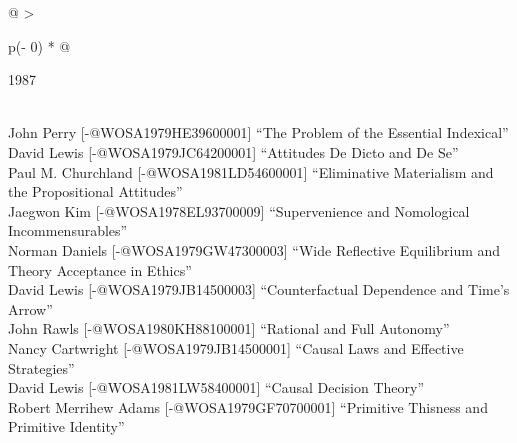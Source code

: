 \documentclass[
  10pt,
  letterpaper,
  DIV=11,
  numbers=noendperiod,
  twoside]{scrartcl}
\begin{document}
\begin{longtable}[]{@{}
  >{\raggedright\arraybackslash}p{(\columnwidth - 0\tabcolsep) * }@{}}

\caption{\label{tbl-top-ten-1978}Most cited articles published less than
ten years ago as of 1987.}

\tabularnewline

\toprule\noalign{}
\begin{minipage}[b]{\linewidth}\raggedright
1987
\end{minipage} \\
\midrule\noalign{}
\endhead
\bottomrule\noalign{}
\endlastfoot
John Perry {[}-@WOSA1979HE39600001{]} ``The Problem of the Essential
Indexical'' \\
David Lewis {[}-@WOSA1979JC64200001{]} ``Attitudes De Dicto and De
Se'' \\
Paul M. Churchland {[}-@WOSA1981LD54600001{]} ``Eliminative Materialism
and the Propositional Attitudes'' \\
Jaegwon Kim {[}-@WOSA1978EL93700009{]} ``Supervenience and Nomological
Incommensurables'' \\
Norman Daniels {[}-@WOSA1979GW47300003{]} ``Wide Reflective Equilibrium
and Theory Acceptance in Ethics'' \\
David Lewis {[}-@WOSA1979JB14500003{]} ``Counterfactual Dependence and
Time's Arrow'' \\
John Rawls {[}-@WOSA1980KH88100001{]} ``Rational and Full Autonomy'' \\
Nancy Cartwright {[}-@WOSA1979JB14500001{]} ``Causal Laws and Effective
Strategies'' \\
David Lewis {[}-@WOSA1981LW58400001{]} ``Causal Decision Theory'' \\
Robert Merrihew Adams {[}-@WOSA1979GF70700001{]} ``Primitive Thisness
and Primitive Identity'' \\

\end{longtable}
\end{document}
